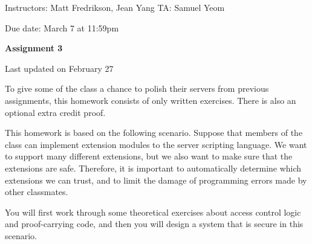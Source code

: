 \documentclass[11pt]{article}
\newcommand*{\stuname}{}
\newcommand*{\assignmentnumb}{3}
\begin{document}
\centerline{Instructors: Matt Fredrikson, Jean Yang \hfill TA: Samuel Yeom} 
\vspace{0.5ex}
Due date: March 7 at 11:59pm \\
\vspace{1.5ex}
\centerline{\Large\bf Assignment \assignmentnumb}
\vspace{0.5ex}
\centerline{\Large\bf \stuname}
\parbox{\textwidth}{\hfill \color{red} Last updated on February 27}

To give some of the class a chance to polish their servers from previous assignments, this homework consists of only written exercises. There is also an optional extra credit proof.

This homework is based on the following scenario. Suppose that members of the class can implement extension modules to the server scripting language. We want to support many different extensions, but we also want to make sure that the extensions are safe. Therefore, it is important to automatically determine which extensions we can trust, and to limit the damage of programming errors made by other classmates.

You will first work through some theoretical exercises about access control logic and proof-carrying code, and then you will design a system that is secure in this scenario.
\end{document}
